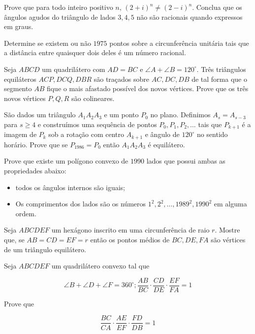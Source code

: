 \begin{questao}
  Prove que para todo inteiro positivo $n$, $(2+i)^n \not
  = (2-i)^n$. Conclua que os ângulos agudos do triângulo de lados
  $3,4,5$ não são racionais quando expressos em graus.
\end{questao}

\begin{questao}
  Determine se existem ou não $1975$ pontos sobre a
  circunferência unitária tais que a distância entre quaisquer dois
  deles é um número racional.
\end{questao}

\begin{questao}
  Seja $ABCD$ um quadrilátero com $AD=BC$ e $\angle A +
  \angle B = 120^\circ$. Três triângulos equiláteros $ACP,DCQ,DBR$
  são traçados sobre $AC,DC,DB$ de tal forma que o segmento $AB$
  fique o mais afastado possível dos novos vértices. Prove que os três
  novos vértices $P,Q,R$ são colineares.
\end{questao}

\begin{questao}
  São dados um triângulo $A_1A_2A_3$ e um ponto $P_0$
  no plano. Definimos $A_s=A_{s-3}$ para $s \geq 4$ e construímos
  uma sequência de pontos $P_0,P_1,P_2,\ldots$ tais que $P_{k+1}$
  é a imagem de $P_k$ sob a rotação com centro $A_{k+1}$ e ângulo
  de $120^\circ$ no sentido horário. Prove que se $P_{1986} = P_0$
  então $A_1A_2A_3$ é equilátero.
\end{questao}

\begin{questao}
  Prove que existe um polígono convexo de $1990$ lados que
  possui ambas as propriedades abaixo:
  \begin{itemize}
    \item todos os ângulos internos são iguais;
    \item Os comprimentos dos lados são os números
    $1^2,2^2,\ldots,1989^2,1990^2$ em alguma ordem.
  \end{itemize}
\end{questao}

\begin{questao}
  Seja $ABCDEF$ um hexágono inscrito em uma
  circunferência de raio $r$. Mostre que, se $AB=CD=EF=r$ então os
  pontos médios de $BC,DE,FA$ são vértices de um triângulo
  equilátero.
\end{questao}

\begin{questao}
  Seja $ABCDEF$ um quadrilátero convexo tal que

  $$\angle B + \angle D + \angle F = 360^\circ ;
  \frac{AB}{BC} \cdot \frac{CD}{DE} \cdot \frac{EF}{FA} = 1$$

  Prove que

  $$ \frac{BC}{CA} \cdot \frac{AE}{EF} \cdot \frac{FD}{DB} = 1$$
\end{questao}

